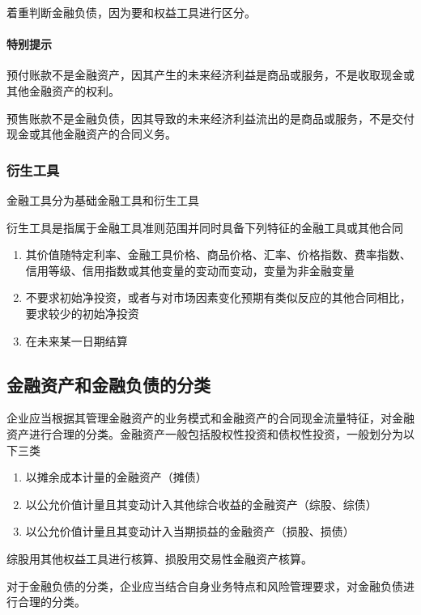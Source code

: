 \documentclass[UTF8,12pt]{ctexart}
\numberwithin{equation}{section} %
\numberwithin{figure}{section}
\numberwithin{table}{section}
\begin{document}
	着重判断金融负债，因为要和权益工具进行区分。
	
	\paragraph{特别提示}
	预付账款不是金融资产，因其产生的未来经济利益是商品或服务，不是收取现金或其他金融资产的权利。
	
	预售账款不是金融负债，因其导致的未来经济利益流出的是商品或服务，不是交付现金或其他金融资产的合同义务。
	
	
	\subsubsection{衍生工具}
	金融工具分为基础金融工具和衍生工具
	
	衍生工具是指属于金融工具准则范围并同时具备下列特征的金融工具或其他合同
	\begin{enumerate}
		\item 其价值随特定利率、金融工具价格、商品价格、汇率、价格指数、费率指数、信用等级、信用指数或其他变量的变动而变动，变量为非金融变量
		
		\item 不要求初始净投资，或者与对市场因素变化预期有类似反应的其他合同相比，要求较少的初始净投资
		
		\item 在未来某一日期结算
	\end{enumerate}
	
	\subsection{金融资产和金融负债的分类}
	企业应当根据其管理金融资产的业务模式和金融资产的合同现金流量特征，对金融资产进行合理的分类。金融资产一般包括股权性投资和债权性投资，一般划分为以下三类
	\begin{enumerate}
		\item 以摊余成本计量的金融资产（摊债）
		
		\item 以公允价值计量且其变动计入其他综合收益的金融资产（综股、综债）
		
		\item 以公允价值计量且其变动计入当期损益的金融资产（损股、损债）
	\end{enumerate}

	综股用其他权益工具进行核算、损股用交易性金融资产核算。
	
	对于金融负债的分类，企业应当结合自身业务特点和风险管理要求，对金融负债进行合理的分类。
	
\end{document}
